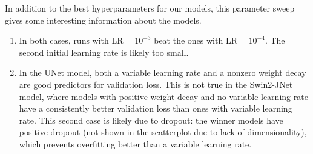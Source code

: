 In addition to the best hyperparameters for our models, this parameter sweep gives some interesting information about the models.
\begin{enumerate}
	\item In both cases, runs with $\text{LR} = 10^{-3}$ beat the ones with $\text{LR} = 10^{-4}$. The second initial learning rate is likely too small.
	\item In the UNet model, both a variable learning rate and a nonzero \lt{} weight decay are good predictors for validation loss.
		This is not true in the Swin2-JNet model, where models with positive weight decay and no variable learning rate have a consistently better validation loss than ones with variable learning rate.
		This second case is likely due to dropout: the winner models have positive dropout (not shown in the scatterplot due to lack of dimensionality), which prevents overfitting better than a variable learning rate.
\end{enumerate}

\vfill{}

